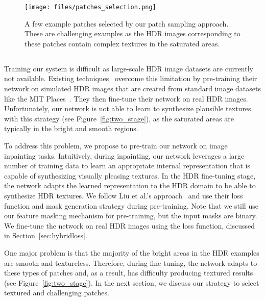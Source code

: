 \begin{figure}
  \texttt{[image: files/patches\_selection.png]}
  \vspace{-0.15in}
  \caption{A few example patches selected by our patch sampling approach. These are challenging examples as the HDR images corresponding to these patches contain complex textures in the saturated areas.}
  \label{fig:patches_selection}
  \vspace{-0.20in}
\end{figure}

\subsection{}
\label{sec:train}

Training our system is difficult as large-scale HDR image datasets are currently not available. Existing techniques~\cite{eilertsen2017hdr} overcome this limitation by pre-training their network on simulated HDR images that are created from standard image datasets like the MIT Places~\cite{zhou2014learning}. They then fine-tune their network on real HDR images. Unfortunately, our network is not able to learn to synthesize plausible textures with this strategy (see Figure~\ref{fig:two_stage}), as the saturated areas are typically in the bright and smooth regions.

To address this problem, we propose to pre-train our network on image inpainting tasks. Intuitively, during inpainting, our network leverages a large number of training data to learn an appropriate internal representation that is capable of synthesizing visually pleasing textures. In the HDR fine-tuning stage, the network adapts the learned representation to the HDR domain to be able to synthesize HDR textures. We follow Liu et al.'s approach~ and use their loss function and mask generation strategy during pre-training. Note that we still use our feature masking mechanism for pre-training, but the input masks are binary. We fine-tune the network on real HDR images using the loss function, discussed in Section~\ref{sec:hybridloss}. 

One major problem is that the majority of the bright areas in the HDR examples are smooth and textureless. Therefore, during fine-tuning, the network adapts to these types of patches and, as a result, has difficulty producing textured results (see Figure~\ref{fig:two_stage}). In the next section, we discuss our strategy to select textured and challenging patches.


